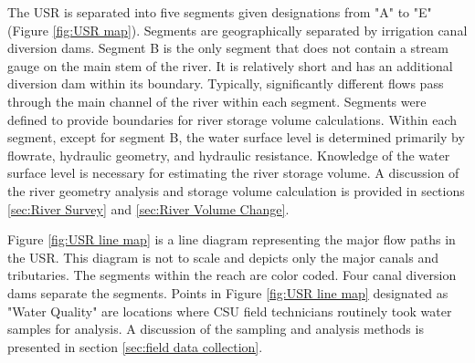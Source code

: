 \begin{linenumbers}[1]

The USR is separated into five segments given designations from "A" to "E" (Figure \ref{fig:USR map}).  Segments are geographically separated by irrigation canal diversion dams.  Segment B is the only segment that does not contain a stream gauge on the main stem of the river.  It is relatively short and has an additional diversion dam within its boundary.  Typically, significantly different flows pass through the main channel of the river within each segment.  Segments were defined to provide boundaries for river storage volume calculations.  Within each segment, except for segment B, the water surface level is determined primarily by flowrate, hydraulic geometry, and hydraulic resistance.  Knowledge of the water surface level is necessary for estimating the river storage volume.  A discussion of the river geometry analysis and storage volume calculation is provided in sections \ref{sec:River Survey} and \ref{sec:River Volume Change}. 

Figure \ref{fig:USR line map} is a line diagram representing the major flow paths in the USR.  This diagram is not to scale and depicts only the major canals and tributaries.  The segments within the reach are color coded.  Four canal diversion dams separate the segments.  Points in Figure \ref{fig:USR line map} designated as "Water Quality" are locations where CSU field technicians routinely took water samples for analysis.  A discussion of the sampling and analysis methods is presented in section \ref{sec:field data collection}.


\end{linenumbers}
